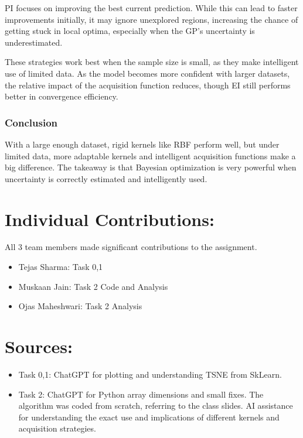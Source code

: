 \documentclass{article}
\begin{document}
PI focuses on improving the best current prediction. While this can lead to faster improvements initially, it may ignore unexplored regions, increasing the chance of getting stuck in local optima, especially when the GP’s uncertainty is underestimated.

These strategies work best when the sample size is small, as they make intelligent use of limited data. As the model becomes more confident with larger datasets, the relative impact of the acquisition function reduces, though EI still performs better in convergence efficiency.

\subsubsection{Conclusion}
With a large enough dataset, rigid kernels like RBF perform well, but under limited data, more adaptable kernels and intelligent acquisition functions make a big difference. The takeaway is that Bayesian optimization is very powerful when uncertainty is correctly estimated and intelligently used. 

\section{Individual Contributions:}
All 3 team members made significant contributions to the assignment.
\begin{itemize}
    \item Tejas Sharma: Task 0,1
    \item Muskaan Jain: Task 2 Code and Analysis
    \item Ojas Maheshwari: Task 2 Analysis
\end{itemize}

\section{Sources:}
\begin{itemize}
    \item Task 0,1: ChatGPT for plotting and understanding TSNE from SkLearn.
    \item Task 2: ChatGPT for Python array dimensions and small fixes. The algorithm was coded from scratch, referring to the class slides. AI assistance for understanding the exact use and implications of different kernels and acquisition strategies. 
\end{itemize}
\end{document}

